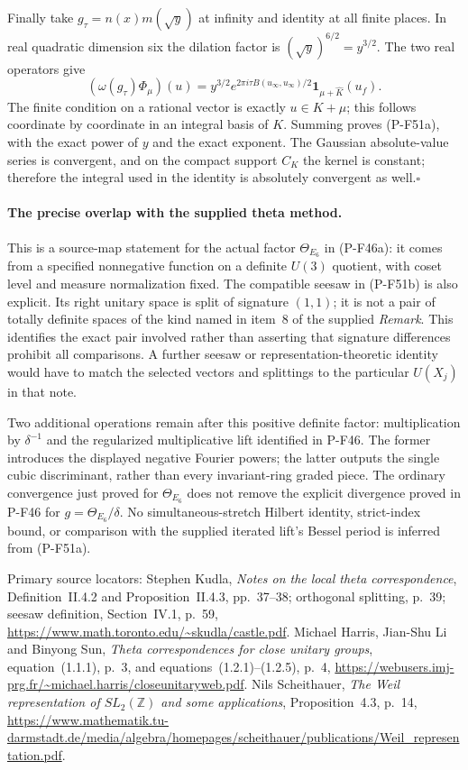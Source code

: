 Finally take $g_\tau=n(x)m(\sqrt y)$ at infinity and
identity at all finite places. In real quadratic
dimension six the dilation factor is
$(\sqrt y)^{6/2}=y^{3/2}$. The two real operators give
\[
 (\omega(g_\tau)\Phi_\mu)(u)
     =y^{3/2}e^{2\pi i\tau B(u_\infty,u_\infty)/2}
                            \mathbf1_{\mu+\widehat K}(u_f).
\]
The finite condition on a rational vector is exactly
$u\in K+\mu$; this follows coordinate by coordinate in
an integral basis of $K$. Summing proves (P-F51a),
with the exact power of $y$ and the exact exponent.
The Gaussian absolute-value series is convergent,
and on the compact support $C_K$ the kernel is constant;
therefore the integral used in the identity is absolutely
convergent as well.\hfill$\square$

\paragraph{The precise overlap with the supplied theta method.}
This is a source-map statement for the actual factor
$\Theta_{E_6}$ in (P-F46a): it comes from a specified
nonnegative function on a definite $U(3)$ quotient,
with coset level and measure normalization fixed.
The compatible seesaw in (P-F51b) is also explicit.
Its right unitary space is split of signature $(1,1)$;
it is not a pair of totally definite spaces of the
kind named in item~8 of the supplied \emph{Remark}.
This identifies the exact pair involved rather than
asserting that signature differences prohibit all
comparisons. A further seesaw or representation-theoretic
identity would have to match the selected vectors and
splittings to the particular $U(X_j)$ in that note.

Two additional operations remain after this positive
definite factor: multiplication by $\delta^{-1}$ and
the regularized multiplicative lift identified in
P-F46. The former introduces the displayed negative
Fourier powers; the latter outputs the single cubic
discriminant, rather than every invariant-ring graded
piece. The ordinary convergence just proved for
$\Theta_{E_6}$ does not remove the explicit divergence
proved in P-F46 for $g=\Theta_{E_6}/\delta$.
No simultaneous-stretch Hilbert identity, strict-index
bound, or comparison with the supplied iterated lift's
Bessel period is inferred from (P-F51a).

Primary source locators: Stephen Kudla,
\emph{Notes on the local theta correspondence},
Definition~II.4.2 and Proposition~II.4.3, pp.~37--38;
orthogonal splitting, p.~39; seesaw definition,
Section~IV.1, p.~59,
\url{https://www.math.toronto.edu/~skudla/castle.pdf}.
Michael Harris, Jian-Shu Li and Binyong Sun,
\emph{Theta correspondences for close unitary groups},
equation~(1.1.1), p.~3, and equations~(1.2.1)--(1.2.5),
p.~4,
\url{https://webusers.imj-prg.fr/~michael.harris/closeunitaryweb.pdf}.
Nils Scheithauer, \emph{The Weil representation of $SL_2(\mathbb Z)$
and some applications}, Proposition~4.3, p.~14,
\url{https://www.mathematik.tu-darmstadt.de/media/algebra/homepages/scheithauer/publications/Weil_representation.pdf}.
